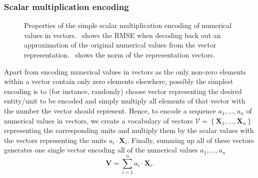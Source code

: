 \subsubsection{Scalar multiplication encoding}%
\label{ssubsec:scalar_multiplication_encoding}

\begin{figure}[t]
    \centering
    \caption{Properties of the simple scalar multiplication encoding of numerical values in vectors.~\protect{} shows the \ac{RMSE} when decoding back out an approximation of the original numerical values from the vector representation.~\protect{} shows the norm of the representation vectors.}
    \label{fig:scalar_multiplication_encoding}
\end{figure}
Apart from encoding numerical values in vectors as the only non-zero elements within a vector contain only zero elements elsewhere, possibly the simplest encoding is to (for instance, randomly) choose vector representing the desired entity/unit to be encoded and simply multiply all elements of that vector with the number the vector should represent.
Hence, to encode a sequence $a_{1}, \ldots, a_{n}$ of numerical values in vectors, we create a vocabulary of vectors $\mathcal{V}=\left\{ \mathbf{X}_{1}, \ldots, \mathbf{X}_{n} \right\}$ representing the corresponding units and multiply them by the scalar values with the vectors representing the units $a_{i}\cdot \mathbf{X}_{i}$.
Finally, summing up all of these vectors generates one single vector encoding all of the numerical values $a_{1}, \ldots, a_{n}$ 
\begin{equation}
\label{eq:scalar_mult_encoding}
\mathbf{V} = \sum\limits_{i=1}^{n} a_{i}\cdot \mathbf{X}_{i}. 
\end{equation}

